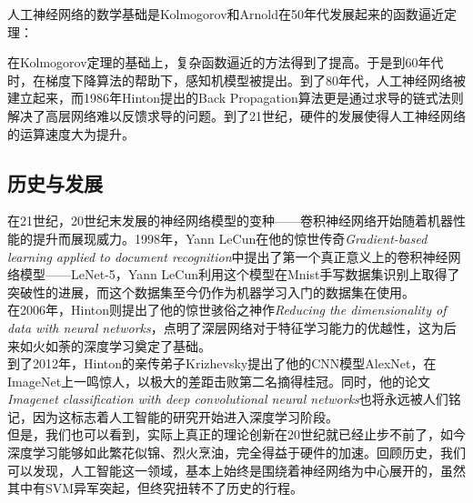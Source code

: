 \documentclass[12pt]{article}
\begin{document}
人工神经网络的数学基础是Kolmogorov和Arnold在50年代发展起来的函数逼近定理：\\

\noindent
{}

\bigskip

在Kolmogorov定理的基础上，复杂函数逼近的方法得到了提高。于是到60年代时，在梯度下降算法的帮助下，感知机模型被提出。到了80年代，人工神经网络被建立起来，而1986年Hinton提出的Back Propagation算法更是通过求导的链式法则解决了高层网络难以反馈求导的问题。到了21世纪，硬件的发展使得人工神经网络的运算速度大为提升。

\subsection{历史与发展}

在21世纪，20世纪末发展的神经网络模型的变种——卷积神经网络开始随着机器性能的提升而展现威力。1998年，Yann LeCun在他的惊世传奇\emph{Gradient-based learning applied to document recognition}中提出了第一个真正意义上的卷积神经网络模型——LeNet-5，Yann LeCun利用这个模型在Mnist手写数据集识别上取得了突破性的进展，而这个数据集至今仍作为机器学习入门的数据集在使用。\\

在2006年，Hinton则提出了他的惊世骇俗之神作\emph{Reducing the dimensionality of data with neural networks}，点明了深层网络对于特征学习能力的优越性，这为后来如火如荼的深度学习奠定了基础。\\

到了2012年，Hinton的亲传弟子Krizhevsky提出了他的CNN模型AlexNet，在ImageNet上一鸣惊人，以极大的差距击败第二名摘得桂冠。同时，他的论文\emph{Imagenet classification with deep convolutional neural networks}也将永远被人们铭记，因为这标志着人工智能的研究开始进入深度学习阶段。\\

但是，我们也可以看到，实际上真正的理论创新在20世纪就已经止步不前了，如今深度学习能够如此繁花似锦、烈火烹油，完全得益于硬件的加速。回顾历史，我们可以发现，人工智能这一领域，基本上始终是围绕着神经网络为中心展开的，虽然其中有SVM异军突起，但终究扭转不了历史的行程。
\end{document}
